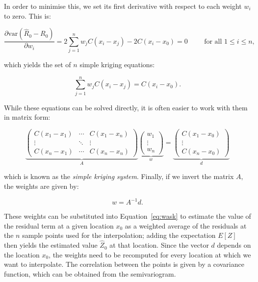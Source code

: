 In order to minimise this, we set its first derivative with respect to each weight \(w_i\) to zero.
This is:

\begin{equation}
\frac{\partial \mathrm{var}\left(\hat{R}_0 - R_0\right)}{\partial w_i} = 2 \sum_{j=1}^n w_j C(x_i-x_j) - 2C(x_i-x_0) = 0 \hspace{1cm} \text{for all } 1 \leq i \leq n, \nonumber
\end{equation}

which yields the set of \(n\) simple kriging equations:

\begin{equation}
\sum_{j=1}^n w_j C(x_i-x_j) = C(x_i-x_0).
\end{equation}

While these equations can be solved directly, it is often easier to work with them in matrix form:

\begin{equation}
\underbrace{\left( \begin{array}{ccc}
C(x_1-x_1) & \cdots & C(x_1-x_n) \\
\vdots & \ddots & \vdots \\
C(x_n-x_1) & \cdots & C(x_n-x_n) \end{array} \right)}_{A}
%
\underbrace{\left(\begin{array}{c}
w_1 \\
\vdots \\
w_n \end{array} \right)}_{w}
 = 
%
\underbrace{\left(\begin{array}{c}
C(x_1-x_0) \\
\vdots \\
C(x_n-x_0) \end{array} \right)}_{d}
\end{equation}

which is known as the \emph{simple kriging system}.
Finally, if we invert the matrix \(A\), the weights are given by:

\begin{equation}
w = A^{-1}d.
\end{equation}

These weights can be substituted into Equation~\ref{eq:wask} to estimate the value of the residual term at a given location \(x_0\) as a weighted average of the residuals at the \(n\) sample points used for the interpolation; adding the expectation \(E[Z]\) then yields the estimated value \(\hat{Z}_0\) at that location.
Since the vector \(d\) depends on the location \(x_0\), the weights need to be recomputed for every location at which we want to interpolate.
The correlation between the points is given by a covariance function, which can be obtained from the semivariogram.

